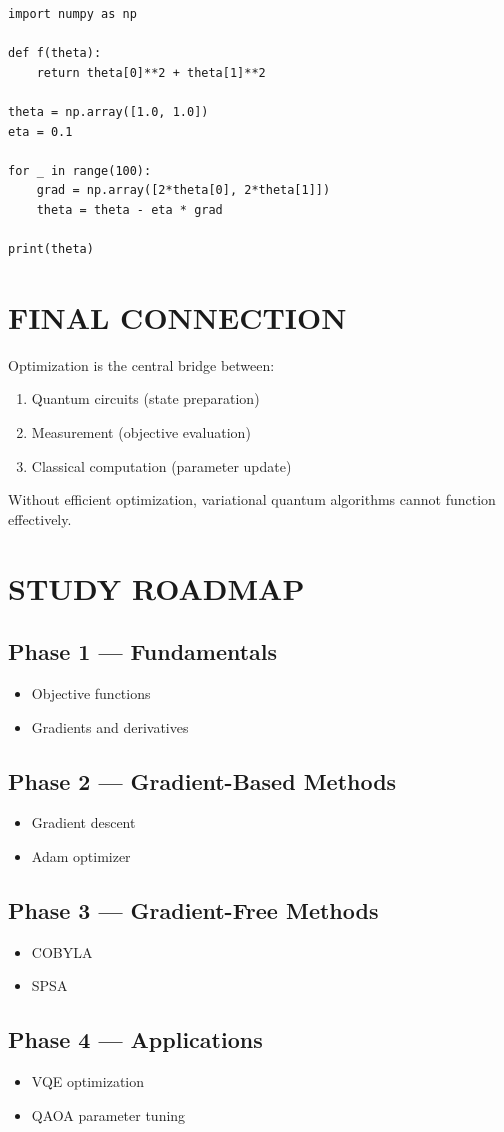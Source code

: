 \begin{verbatim}
import numpy as np

def f(theta):
    return theta[0]**2 + theta[1]**2

theta = np.array([1.0, 1.0])
eta = 0.1

for _ in range(100):
    grad = np.array([2*theta[0], 2*theta[1]])
    theta = theta - eta * grad

print(theta)
\end{verbatim}

\vspace{0.5cm}

\section*{FINAL CONNECTION}

Optimization is the central bridge between:

\begin{enumerate}
\item Quantum circuits (state preparation)
\item Measurement (objective evaluation)
\item Classical computation (parameter update)
\end{enumerate}

Without efficient optimization, variational quantum algorithms cannot function effectively.

\vspace{0.5cm}

\section*{STUDY ROADMAP}

\subsection*{Phase 1 --- Fundamentals}
\begin{itemize}
\item Objective functions
\item Gradients and derivatives
\end{itemize}

\subsection*{Phase 2 --- Gradient-Based Methods}
\begin{itemize}
\item Gradient descent
\item Adam optimizer
\end{itemize}

\subsection*{Phase 3 --- Gradient-Free Methods}
\begin{itemize}
\item COBYLA
\item SPSA
\end{itemize}

\subsection*{Phase 4 --- Applications}
\begin{itemize}
\item VQE optimization
\item QAOA parameter tuning
\end{itemize}